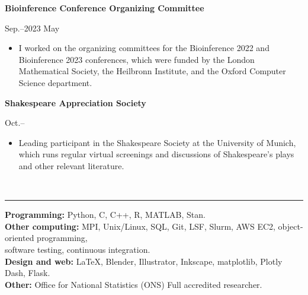 \documentclass[11pt]{article}
\begin{document}
\vspace{.2cm}


\noindent\parbox{.75\textwidth}{\raggedright \textbf{Bioinference Conference Organizing Committee\\ \vspace{.1cm}}}
\parbox{.25\textwidth}{ Sep.--2023 May}
\vspace{-.65cm}
\begin{itemize}
\setlength{\itemsep}{4pt}
\setlength{\parskip}{0pt}
\setlength{\parsep}{0pt}
\item I worked on the organizing committees for the Bioinference 2022 and Bioinference 2023 conferences, which were funded by the London Mathematical Society, the Heilbronn Institute, and the Oxford Computer Science department.
\end{itemize}


\vspace{.2cm}


\noindent\parbox{.75\textwidth}{\raggedright \textbf{Shakespeare Appreciation Society}}
\parbox{.25\textwidth}{ Oct.--}
\vspace{-.65cm}
\begin{itemize}
\setlength{\itemsep}{4pt}
\setlength{\parskip}{0pt}
\setlength{\parsep}{0pt}
\item Leading participant in the Shakespeare Society at the University of Munich, which runs regular virtual screenings and discussions of Shakespeare's plays and other relevant literature.
\end{itemize}



\vspace{0.5cm}


\vspace{-2.75mm} \\
\rule{\textwidth}{0.4pt}
\vspace{0.1mm}
\textbf{Programming:} Python, C, C++, R, MATLAB, Stan.\\
\textbf{Other computing:} MPI, Unix/Linux, SQL, Git, LSF, Slurm, AWS EC2, object-oriented programming,\\
software testing, continuous integration. \\
\textbf{Design and web:} LaTeX, Blender, Illustrator, Inkscape, matplotlib, Plotly Dash, Flask.\\
\textbf{Other:} Office for National Statistics (ONS) Full accredited researcher.
\end{document}

